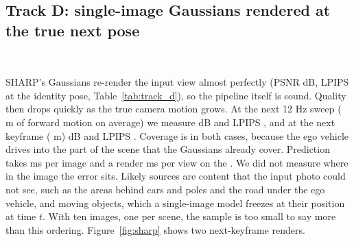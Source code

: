 \documentclass[10pt]{article}
\newcommand{\gpu}{\GPUname}
\begin{document}
\subsection{Track D: single-image Gaussians rendered at the true next pose}
\label{sec:track_d}

\begin{table}[t]
\centering
\begin{subtable}[t]{\textwidth}
\centering
{}
\caption{Track D: SHARP Gaussians from one CAM\_FRONT keyframe per scene (\SharpImages{} images), rendered at three poses and compared with the real frame on covered pixels. Motion is the mean camera translation.}
\label{tab:track_d}
\end{subtable}\\[4pt]
\begin{subtable}[t]{\textwidth}
\centering
{}
\caption{Track E on \NFtestPairs{} held-out pairs from scenes \NFholdoutScenes{}: PSNR and LPIPS against the real next frame. \NFseedCaption}
\label{tab:track_e}
\end{subtable}
\caption{Synthesis tracks, means with 95\% bootstrap intervals.}
\label{tab:synthesis}
\end{table}

SHARP's Gaussians re-render the input view almost perfectly (PSNR \SharpIdpsnr{} dB, LPIPS \SharpIdlpips{}
at the identity pose, Table~\ref{tab:track_d}), so the pipeline itself is sound. Quality then drops quickly
as the true camera motion grows. At the next 12 Hz sweep (\SharpSweepmotion{} m of forward motion on
average) we measure \SharpSweeppsnr{} dB and LPIPS \SharpSweeplpips, and at the next keyframe
(\SharpKeymotion{} m) \SharpKeypsnr{} dB and LPIPS \SharpKeylpips. Coverage is \SharpKeycoverage{} in both
cases, because the ego vehicle drives into the part of the scene that the Gaussians already cover.
Prediction takes \SharpPredictMs{} ms per image and a render \SharpRenderMs{} ms per view on the \gpu{}.
We did not measure where in the image the error sits. Likely sources are content that the input photo could
not see, such as the areas behind cars and poles and the road under the ego vehicle, and moving objects,
which a single-image model freezes at their position at time $t$. With ten images, one per scene, the
sample is too small to say more than this ordering. Figure~\ref{fig:sharp} shows two next-keyframe renders.
\end{document}
